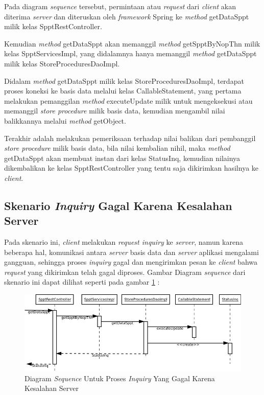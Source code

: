 Pada diagram \textit{sequence} tersebut, permintaan atau \textit{request} dari \textit{client} akan diterima \textit{server} dan diteruskan oleh \textit{framework} Spring ke \textit{method} getDataSppt milik kelas SpptRestController.

Kemudian \textit{method} getDataSppt akan memanggil \textit{method} getSpptByNopThn milik kelas SpptServicesImpl, yang didalamnya hanya memanggil \textit{method} getDataSppt milik kelas StoreProceduresDaoImpl.

Didalam \textit{method} getDataSppt milik kelas StoreProceduresDaoImpl, terdapat proses koneksi ke basis data melalui kelas CallableStatement, yang pertama melakukan pemanggilan \textit{method} executeUpdate milik untuk mengeksekusi atau memanggil \textit{store procedure} milik basis data, kemudian mengambil nilai balikkannya melalui \textit{method} getObject.

Terakhir adalah melakukan pemeriksaan terhadap nilai balikan dari pembanggil \textit{store procedure} milik basis data, bila nilai kembalian nihil, maka \textit{method} getDataSppt akan membuat instan dari kelas StatusInq, kemudian nilainya dikembalikan ke kelas SpptRestController yang tentu saja dikirimkan hasilnya ke \textit{client}.

\subsection{Skenario \textit{Inquiry} Gagal Karena Kesalahan Server}

Pada skenario ini, \textit{client} melakukan \textit{request inquiry} ke \textit{server}, namun karena beberapa hal, komunikasi antara \textit{server} basis data dan \textit{server} aplikasi mengalami gangguan, sehingga proses \textit{inquiry} gagal dan mengirimkan pesan ke \textit{client} bahwa \textit{request} yang dikirimkan telah gagal diproses. Gambar Diagram \textit{sequence} dari skenario ini dapat dilihat seperti pada gambar \ref{fig:uml-seq-inq-db-error} :

\begin{figure}[H]
  \centering
  \includegraphics[width=1\textwidth]{./resources/uml/uml-seq-inq-db-error}
  \caption{Diagram \textit{Sequence} Untuk Proses \textit{Inquiry} Yang Gagal Karena Kesalahan Server}
  \label{fig:uml-seq-inq-db-error}
\end{figure}

